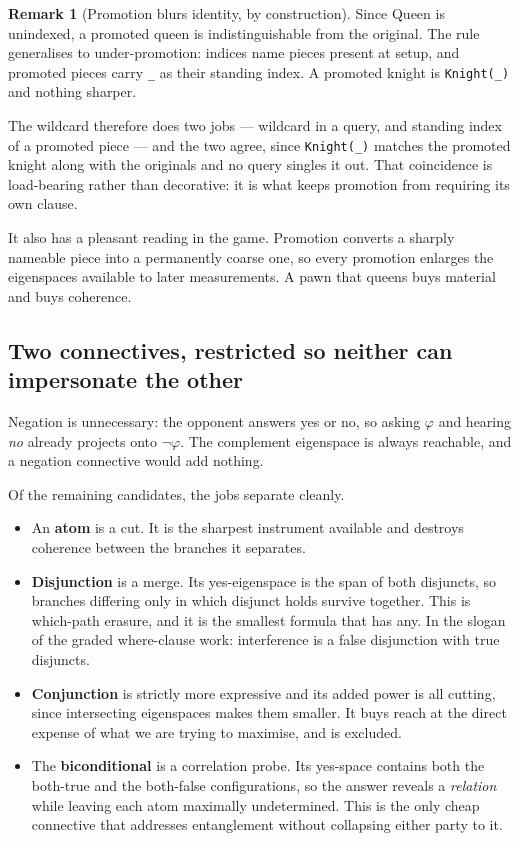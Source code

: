 \documentclass[11pt,a4paper]{article}
\theoremstyle{definition}
\newtheorem{remark}[definition]{Remark}
\theoremstyle{plain}
\begin{document}
\begin{remark}[Promotion blurs identity, by construction]
Since Queen is unindexed, a promoted queen is indistinguishable from the
original. The rule generalises to under-promotion: indices name pieces present
at setup, and promoted pieces carry \texttt{\_} as their standing index. A
promoted knight is \texttt{Knight(\_)} and nothing sharper.

The wildcard therefore does two jobs --- wildcard in a query, and standing
index of a promoted piece --- and the two agree, since \texttt{Knight(\_)}
matches the promoted knight along with the originals and no query singles it
out. That coincidence is load-bearing rather than decorative: it is what keeps
promotion from requiring its own clause.

It also has a pleasant reading in the game. Promotion converts a sharply
nameable piece into a permanently coarse one, so every promotion enlarges the
eigenspaces available to later measurements. A pawn that queens buys material
and buys coherence.
\end{remark}

\subsection{Two connectives, restricted so neither can impersonate the other}

Negation is unnecessary: the opponent answers yes or no, so asking $\varphi$
and hearing \emph{no} already projects onto $\neg\varphi$. The complement
eigenspace is always reachable, and a negation connective would add nothing.

Of the remaining candidates, the jobs separate cleanly.

\begin{itemize}[leftmargin=1.4em]
\item An \textbf{atom} is a cut. It is the sharpest instrument available and
      destroys coherence between the branches it separates.
\item \textbf{Disjunction} is a merge. Its yes-eigenspace is the span of both
      disjuncts, so branches differing only in which disjunct holds survive
      together. This is which-path erasure, and it is the smallest formula that
      has any. In the slogan of the graded where-clause work: interference is a
      false disjunction with true disjuncts.
\item \textbf{Conjunction} is strictly more expressive and its added power is
      all cutting, since intersecting eigenspaces makes them smaller. It buys
      reach at the direct expense of what we are trying to maximise, and is
      excluded.
\item The \textbf{biconditional} is a correlation probe. Its yes-space contains
      both the both-true and the both-false configurations, so the answer
      reveals a \emph{relation} while leaving each atom maximally
      undetermined. This is the only cheap connective that addresses
      entanglement without collapsing either party to it.
\end{itemize}
\end{document}
